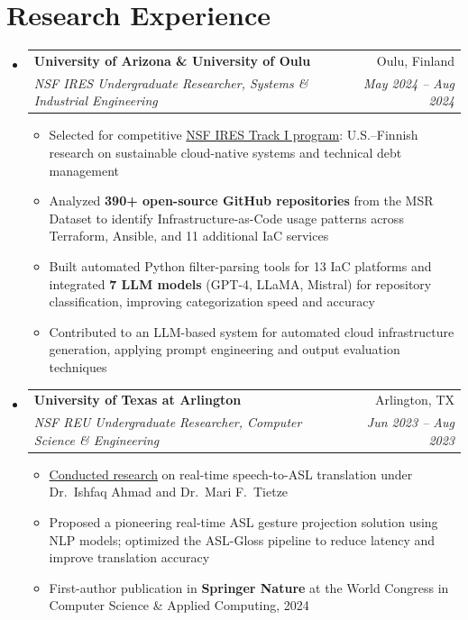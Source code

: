 \documentclass[letterpaper,10.5pt]{article}
\makeatletter
\newcommand{\resumeItem}[1]{
  \item\small{
    {#1 \vspace{-2pt}}
  }
}
\newcommand{\resumeSubheading}[4]{
  \vspace{-2pt}\item
    \begin{tabular*}{0.97\textwidth}[t]{l@{\extracolsep{\fill}}r}
      \textbf{#1} & #2 \\
      \textit{\small#3} & \textit{\small #4} \\
    \end{tabular*}\vspace{-7pt}
}
\newcommand{\resumeSubHeadingListStart}{\begin{itemize}[leftmargin=0.15in, label={}]}
\newcommand{\resumeSubHeadingListEnd}{\end{itemize}}
\newcommand{\resumeItemListStart}{\begin{itemize}}
\newcommand{\resumeItemListEnd}{\end{itemize}\vspace{-5pt}}
\makeatother
\begin{document}
\section{Research Experience}
  \resumeSubHeadingListStart
    \resumeSubheading
      {University of Arizona \& University of Oulu}{Oulu, Finland}
      {NSF IRES Undergraduate Researcher, Systems \& Industrial Engineering}{May 2024 -- Aug 2024}
      \resumeItemListStart
        \resumeItem{Selected for competitive \href{https://etap.nsf.gov/award/5712/opportunity/6703}{NSF IRES Track I program}: U.S.--Finnish research on sustainable cloud-native systems and technical debt management}
        \resumeItem{Analyzed \textbf{390+ open-source GitHub repositories} from the MSR Dataset to identify Infrastructure-as-Code usage patterns across Terraform, Ansible, and 11 additional IaC services}
        \resumeItem{Built automated Python filter-parsing tools for 13 IaC platforms and integrated \textbf{7 LLM models} (GPT-4, LLaMA, Mistral) for repository classification, improving categorization speed and accuracy}
        \resumeItem{Contributed to an LLM-based system for automated cloud infrastructure generation, applying prompt engineering and output evaluation techniques}
      \resumeItemListEnd

    \resumeSubheading
      {University of Texas at Arlington}{Arlington, TX}
      {NSF REU Undergraduate Researcher, Computer Science \& Engineering}{Jun 2023 -- Aug 2023}
      \resumeItemListStart
        \resumeItem{\href{https://etap.nsf.gov/award/239/opportunity/661}{Conducted research} on real-time speech-to-ASL translation under Dr.\ Ishfaq Ahmad and Dr.\ Mari F.\ Tietze}
        \resumeItem{Proposed a pioneering real-time ASL gesture projection solution using NLP models; optimized the ASL-Gloss pipeline to reduce latency and improve translation accuracy}
        \resumeItem{First-author publication in \textbf{Springer Nature} at the World Congress in Computer Science \& Applied Computing, 2024}
      \resumeItemListEnd
  \resumeSubHeadingListEnd

\end{document}
